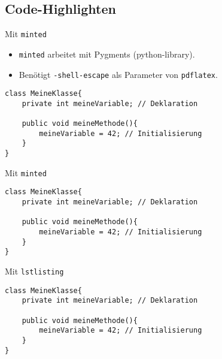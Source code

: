 \documentclass{beamer}
\begin{document}
		
		\subsection{Code-Highlighten}
		
		
		\begin{frame}[containsverbatim]{Mit \texttt{minted}}
			\begin{itemize}
				\item \texttt{minted} arbeitet mit Pygments (python-library).
				\item Benötigt \texttt{-shell-escape} als Parameter von \texttt{pdflatex}. 
			\end{itemize}
			
			\begin{latexcode}
\usepackage{minted}
\begin{verbatim}
class MeineKlasse{
	private int meineVariable; // Deklaration
	
	public void meineMethode(){
		meineVariable = 42; // Initialisierung
	}
}
\end{verbatim}
			\end{latexcode}
		\end{frame}
		
		
		\begin{frame}[containsverbatim]{Mit \texttt{minted}}
			\begin{verbatim}
class MeineKlasse{
	private int meineVariable; // Deklaration
	
	public void meineMethode(){
		meineVariable = 42; // Initialisierung
	}
}
			\end{verbatim}
		\end{frame}
		
		
		\begin{frame}[containsverbatim]{Mit \texttt{lstlisting}}
			\begin{latexcode}
\usepackage{listings}
\lstset{...} %
\begin{lstlisting}[caption=Variablen]
class MeineKlasse{
	private int meineVariable; // Deklaration
	
	public void meineMethode(){
		meineVariable = 42; // Initialisierung
	}
}
\end{lstlisting}
			\end{latexcode}
		\end{frame}
		
\end{document}
